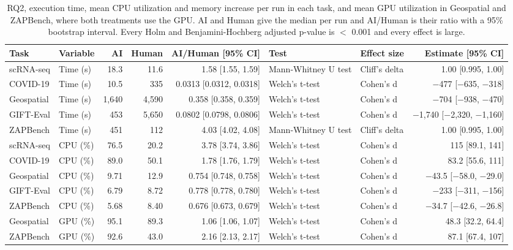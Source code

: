 \begin{table}[ht]
\centering
\caption{RQ2, execution time, mean CPU utilization and memory increase per run in each task, and mean GPU utilization in Geospatial and ZAPBench, where both treatments use the GPU. AI and Human give the median per run and AI/Human is their ratio with a 95\% bootstrap interval. Every Holm and Benjamini-Hochberg adjusted p-value is $<$ 0.001 and every effect is large.} 
\label{tab:05_rq2_performance_tests}
\begingroup\small
\begin{tabular}{llrrrllr}
  \toprule
Task & Variable & AI & Human & AI/Human [95\% CI] & Test & Effect size & Estimate [95\% CI] \\ 
  \midrule
scRNA-seq & Time (s) & 18.3 & 11.6 & 1.58 [1.55, 1.59] & Mann-Whitney U test & Cliff's delta & 1.00 [0.995, 1.00] \\ 
  COVID-19 & Time (s) & 10.5 & 335 & 0.0313 [0.0312, 0.0318] & Welch's t-test & Cohen's d & $-$477 [$-$635, $-$318] \\ 
  Geospatial & Time (s) & 1,640 & 4,590 & 0.358 [0.358, 0.359] & Welch's t-test & Cohen's d & $-$704 [$-$938, $-$470] \\ 
  GIFT-Eval & Time (s) & 453 & 5,650 & 0.0802 [0.0798, 0.0806] & Welch's t-test & Cohen's d & $-$1,740 [$-$2,320, $-$1,160] \\ 
  ZAPBench & Time (s) & 451 & 112 & 4.03 [4.02, 4.08] & Mann-Whitney U test & Cliff's delta & 1.00 [0.995, 1.00] \\ 
  scRNA-seq & CPU (\%) & 76.5 & 20.2 & 3.78 [3.74, 3.86] & Welch's t-test & Cohen's d & 115 [89.1, 141] \\ 
  COVID-19 & CPU (\%) & 89.0 & 50.1 & 1.78 [1.76, 1.79] & Welch's t-test & Cohen's d & 83.2 [55.6, 111] \\ 
  Geospatial & CPU (\%) & 9.71 & 12.9 & 0.754 [0.748, 0.758] & Welch's t-test & Cohen's d & $-$43.5 [$-$58.0, $-$29.0] \\ 
  GIFT-Eval & CPU (\%) & 6.79 & 8.72 & 0.778 [0.778, 0.780] & Welch's t-test & Cohen's d & $-$233 [$-$311, $-$156] \\ 
  ZAPBench & CPU (\%) & 5.68 & 8.40 & 0.676 [0.673, 0.679] & Welch's t-test & Cohen's d & $-$34.7 [$-$42.6, $-$26.8] \\ 
  Geospatial & GPU (\%) & 95.1 & 89.3 & 1.06 [1.06, 1.07] & Welch's t-test & Cohen's d & 48.3 [32.2, 64.4] \\ 
  ZAPBench & GPU (\%) & 92.6 & 43.0 & 2.16 [2.13, 2.17] & Welch's t-test & Cohen's d & 87.1 [67.4, 107] \\ 

\end{tabular}
\end{table}
